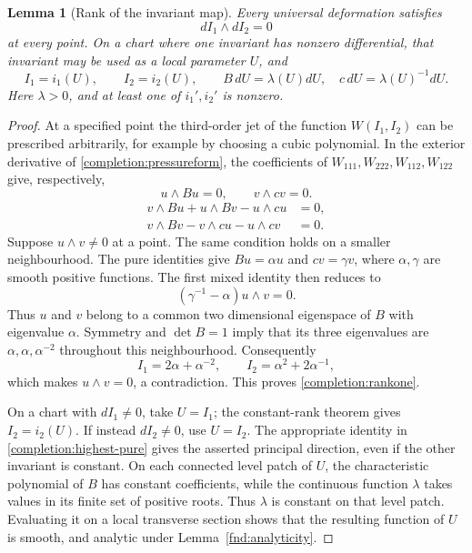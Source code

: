 \documentclass[11pt,a4paper]{article}
\numberwithin{equation}{section}
\theoremstyle{plain}
\newtheorem{lemma}[theorem]{Lemma}
\theoremstyle{definition}
\theoremstyle{remark}
\begin{document}
\begin{lemma}[Rank of the invariant map]
\label{completion:invariant-rank}
Every universal deformation satisfies
\begin{equation}\label{completion:rankone}
 dI_1\wedge dI_2=0
\end{equation}
at every point. On a chart where one invariant has nonzero differential,
that invariant may be used as a local parameter $U$, and
\[
 I_1=i_1(U),\qquad I_2=i_2(U),\qquad
 B\,dU=\lambda(U)dU,\quad c\,dU=\lambda(U)^{-1}dU.
\]
Here $\lambda>0$, and at least one of $i_1',i_2'$ is nonzero.
\end{lemma}
\begin{proof}
At a specified point the third-order jet of the function
$W(I_1,I_2)$ can be prescribed arbitrarily, for example by choosing a
cubic polynomial. In the exterior derivative of
\eqref{completion:pressureform}, the coefficients of
$W_{111},W_{222},W_{112},W_{122}$ give, respectively,
\begin{equation}\label{completion:highest-pure}
 u\wedge Bu=0,\qquad v\wedge cv=0.
\end{equation}
\begin{equation}\label{completion:highest-mixed}
 \begin{aligned}
 v\wedge Bu+u\wedge Bv-u\wedge cu&=0,\\
 v\wedge Bv-v\wedge cu-u\wedge cv&=0.
 \end{aligned}
\end{equation}
Suppose $u\wedge v\ne0$ at a point. The same condition holds on a
smaller neighbourhood. The pure identities give
$Bu=\alpha u$ and $cv=\gamma v$, where $\alpha,\gamma$ are smooth
positive functions. The first mixed identity then reduces to
\[
 (\gamma^{-1}-\alpha)u\wedge v=0.
\]
Thus $u$ and $v$ belong to a common two dimensional eigenspace of $B$
with eigenvalue $\alpha$. Symmetry and $\det B=1$ imply that its three
eigenvalues are $\alpha,\alpha,\alpha^{-2}$ throughout this
neighbourhood. Consequently
\[
 I_1=2\alpha+\alpha^{-2},\qquad
 I_2=\alpha^2+2\alpha^{-1},
\]
which makes $u\wedge v=0$, a contradiction. This proves \eqref{completion:rankone}.

On a chart with $dI_1\ne0$, take $U=I_1$; the constant-rank theorem
gives $I_2=i_2(U)$. If instead $dI_2\ne0$, use $U=I_2$. The appropriate
identity in \eqref{completion:highest-pure} gives the asserted
principal direction, even if the other invariant is constant.
On each connected level patch of $U$, the
characteristic polynomial of $B$ has constant coefficients, while the
continuous function $\lambda$ takes values in its finite set of
positive roots. Thus $\lambda$ is constant on that level patch.
Evaluating it on a local transverse section shows that the resulting
function of $U$ is smooth, and analytic under
Lemma~\ref{fnd:analyticity}.
\end{proof}
\end{document}
